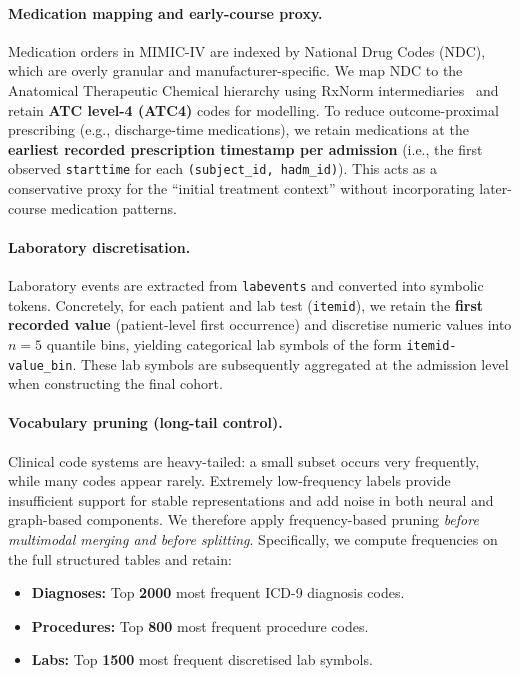 \paragraph{Medication mapping and early-course proxy.}
Medication orders in MIMIC-IV are indexed by National Drug Codes (NDC), which are overly granular and manufacturer-specific. We map NDC to the Anatomical Therapeutic Chemical hierarchy using RxNorm intermediaries~\cite{nlm_rxnorm} and retain \textbf{ATC level-4 (ATC4)} codes for modelling. 
To reduce outcome-proximal prescribing (e.g., discharge-time medications), we retain medications at the \textbf{earliest recorded prescription timestamp per admission} (i.e., the first observed \texttt{starttime} for each \texttt{(subject\_id, hadm\_id)}). This acts as a conservative proxy for the ``initial treatment context'' without incorporating later-course medication patterns.

\paragraph{Laboratory discretisation.}
Laboratory events are extracted from \texttt{labevents} and converted into symbolic tokens. Concretely, for each patient and lab test (\texttt{itemid}), we retain the \textbf{first recorded value} (patient-level first occurrence) and discretise numeric values into $n=5$ quantile bins, yielding categorical lab symbols of the form \texttt{itemid-value\_bin}. These lab symbols are subsequently aggregated at the admission level when constructing the final cohort.

\paragraph{Vocabulary pruning (long-tail control).}
Clinical code systems are heavy-tailed: a small subset occurs very frequently, while many codes appear rarely. Extremely low-frequency labels provide insufficient support for stable representations and add noise in both neural and graph-based components. We therefore apply frequency-based pruning \emph{before multimodal merging and before splitting}. Specifically, we compute frequencies on the full structured tables and retain:
\begin{itemize}
    \item \textbf{Diagnoses:} Top \textbf{2000} most frequent ICD-9 diagnosis codes.
    \item \textbf{Procedures:} Top \textbf{800} most frequent procedure codes.
    \item \textbf{Labs:} Top \textbf{1500} most frequent discretised lab symbols.
\end{itemize}

